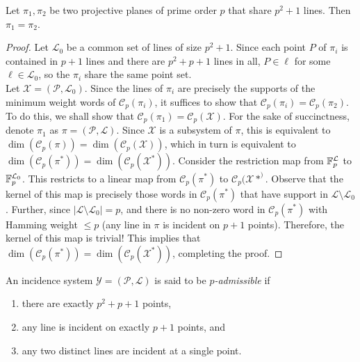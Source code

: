 	\begin{lemma}
		\label{lemma: common lines implies same plane}
		Let $\pi_1,\pi_2$ be two projective planes of prime order $p$ that share $p^2+1$ lines. Then $\pi_1 = \pi_2$.
	\end{lemma}
	\begin{proof}
		Let $\mathcal{L}_0$ be a common set of lines of size $p^2 + 1$.
		Since each point $P$ of $\pi_i$ is contained in $p+1$ lines and there are $p^2 + p + 1$ lines in all, $P \in \ell$ for some $\ell \in \mathcal{L_0}$, so the $\pi_i$ share the same point set.\\
		Let $\mathcal{X} = (\mathcal{P},\mathcal{L}_0)$.
		Since the lines of $\pi_i$ are precisely the supports of the minimum weight words of $\mathcal{C}_p(\pi_i)$, it suffices to show that $\mathcal{C}_p(\pi_i) = \mathcal{C}_p(\pi_2)$. To do this, we shall show that $\mathcal{C}_p(\pi_1) = \mathcal{C}_p(\mathcal{X})$. For the sake of succinctness, denote $\pi_1$ as $\pi = (\mathcal{P},\mathcal{L})$. Since $\mathcal{X}$ is a subsystem of $\pi$, this is equivalent to $\dim(\mathcal{C}_p(\pi)) = \dim(\mathcal{C}_p(\mathcal{X}))$, which in turn is equivalent to $\dim(\mathcal{C}_p(\pi^*)) = \dim(\mathcal{C}_p(\mathcal{X}^*))$. Consider the restriction map from $\mathbb{F}_p^{\mathcal{L}}$ to $\mathbb{F}_p^{\mathcal{L}_0}$. This restricts to a linear map from $\mathcal{C}_p(\pi^*)$ to $\mathcal{C}_p(\mathcal{X}*^)$. Observe that the kernel of this map is precisely those words in $\mathcal{C}_p(\pi^*)$ that have support in $\mathcal{L} \setminus \mathcal{L}_0$. Further, since $|\mathcal{L} \setminus \mathcal{L}_0| = p$, and there is no non-zero word in $\mathcal{C}_p(\pi^*)$ with Hamming weight $\le p$ (any line in $\pi$ is incident on $p+1$ points). Therefore, the kernel of this map is trivial! This implies that $\dim(\mathcal{C}_p(\pi^*)) = \dim(\mathcal{C}_p(\mathcal{X}^*))$, completing the proof.
	\end{proof}

	\begin{fdef}
		An incidence system $\mathcal{Y} = (\mathcal{P},\mathcal{L})$ is said to be \emph{$p$-admissible} if
		\begin{enumerate}
			\item there are exactly $p^2+p+1$ points,
			\item any line is incident on exactly $p+1$ points, and
			\item any two distinct lines are incident at a single point.
		\end{enumerate}
	\end{fdef}

